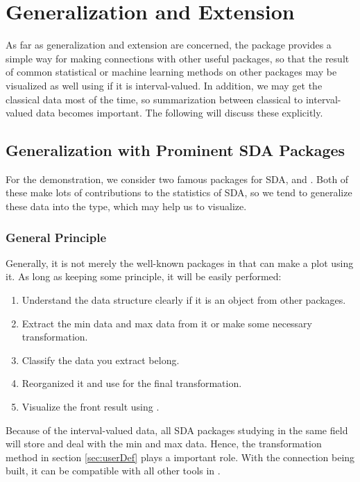 \documentclass[article]{jss}
\begin{document}
\section{Generalization and Extension}

As far as generalization and extension are concerned, the package provides a simple way for making connections with other useful packages, so that the result of common statistical or machine learning methods on other packages may be visualized as well using  if it is interval-valued. In addition, we may get the classical data most of the time, so summarization between classical to interval-valued data becomes important. The following will discuss these explicitly. 

\subsection{Generalization with Prominent SDA Packages}

For the demonstration, we consider two famous  packages for SDA,  \cite{HistDAWass} and  \cite{MAINT.Data}. Both of these make lots of contributions to the statistics of SDA, so we tend to generalize these data into the  type, which may help us to visualize.

\subsubsection{General Principle}\label{sec:genPrin}

Generally, it is not merely the well-known packages in  that can make a plot using it. As long as keeping some principle, it will be easily performed:

\begin{enumerate}
  \item Understand the data structure clearly if it is an object from other packages.
  \item Extract the min data and max data from it or make some necessary transformation.
  \item Classify the data you extract belong.
  \item Reorganized it and use  for the final transformation.
  \item Visualize the front result using .
\end{enumerate}

Because of the interval-valued data, all SDA packages studying in the same field will store and deal with the min and max data. Hence, the transformation method in section \ref{sec:userDef} plays a important role. With the connection being built, it can be compatible with all other tools in .
\end{document}
